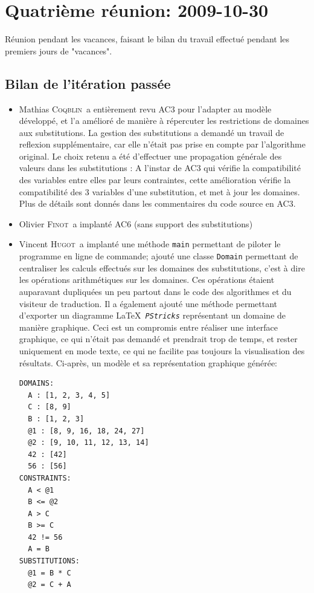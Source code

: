 \documentclass[a4paper,12pt]{article}
\def\tech{\texttt}
\def\familyname{\textsc}
\def\firstname#1{#1}
\def\groupmember#1#2{\firstname{#1} \familyname{#2}}
\def\mmat{\groupmember{Mathias}{Coqblin}}
\def\moli{\groupmember{Olivier}{Finot}}
\def\mvin{\groupmember{Vincent}{Hugot}}
\begin{document}
\section{Quatrième réunion: 2009-10-30}

Réunion pendant les vacances, faisant le bilan du travail
effectué pendant les premiers jours de "vacances".

\subsection{Bilan de l'itération passée}

\begin{itemize}
 \item \mmat\ a entièrement revu AC3 pour l'adapter au modèle développé, et l'a amélioré de manière à répercuter les restrictions de domaines aux substitutions.
 La gestion des substitutions a demandé un travail de reflexion supplémentaire, car elle
 n'était pas prise en compte par l'algorithme original.
 Le choix retenu a été d'effectuer une propagation générale des valeurs dans les substitutions :
 A l'instar de AC3 qui vérifie la compatibilité des variables entre elles par leurs contraintes,
 cette amélioration vérifie la compatibilité des 3 variables d'une substitution, et met à jour les domaines.
 Plus de détails sont donnés dans les commentaires du code source en AC3.
\item \moli\ a implanté AC6 (sans support des substitutions)
\item \mvin\ a implanté une méthode \texttt{main} permettant de piloter le programme
  en ligne de commande; ajouté une classe \tech{Domain} permettant
  de centraliser les calculs effectués sur les domaines des substitutions,
  c'est à dire les opérations arithmétiques sur les domaines. 
  Ces opérations étaient auparavant dupliquées un peu partout dans le
  code des algorithmes et du visiteur de traduction.
  Il a également ajouté une méthode permettant d'exporter 
  un diagramme \LaTeX\ \texttt{\emph{PStricks}} représentant un domaine
  de manière graphique. Ceci est un compromis entre réaliser
  une interface graphique, ce qui n'était pas demandé et
  prendrait trop de temps, et rester uniquement en mode texte,
  ce qui ne facilite pas toujours la visualisation des résultats.
  Ci-après, un modèle et sa représentation graphique générée:
  \begin{verbatim}
DOMAINS:
  A : [1, 2, 3, 4, 5]
  C : [8, 9]
  B : [1, 2, 3]
  @1 : [8, 9, 16, 18, 24, 27]
  @2 : [9, 10, 11, 12, 13, 14]
  42 : [42]
  56 : [56]
CONSTRAINTS:
  A < @1
  B <= @2
  A > C
  B >= C
  42 != 56
  A = B
SUBSTITUTIONS:
  @1 = B * C
  @2 = C + A
  \end{verbatim}



\end{itemize}
\end{document}
